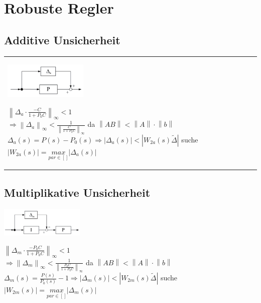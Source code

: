 \section{Robuste Regler}

\subsection{Additive Unsicherheit}

\begin{tabular}{ll}
	\parbox{5cm}{
	\includegraphics[width=4cm]{./bilder/rob_add.png}}
	\parbox{15cm}{
		$ \left \lVert \Delta_a \cdot \frac{-C}{1+P_0 C} \right\rVert_\infty < 1 $\\
		$ \Rightarrow \left \lVert \Delta_a \right\rVert_\infty < \frac{1}{\left \lVert \frac{C}{1+P_0 C} \right\rVert_\infty}$ da $\left \lVert AB \right\rVert < \left \lVert A \right\rVert \cdot \left \lVert b \right\rVert$\\
		$\Delta_a(s)=P(s) - P_0(s) \Rightarrow \left| \Delta_a(s) \right| < \left| W_{2a}(s)\tilde{\Delta} \right| $ suche $\left| W_{2a}(s) \right|  = \underset{par\in[]}{max} \left| \Delta_a(s) \right| $
		}
\end{tabular}		

\subsection{Multiplikative Unsicherheit}
	\parbox{5cm}{
	\includegraphics[width=4cm]{./bilder/rob_mult.png}}
	\parbox{15cm}{
		$ \left \lVert \Delta_m \cdot \frac{-P_0C}{1+P_0 C} \right\rVert_\infty < 1 $\\
		$ \Rightarrow \left \lVert \Delta_m \right\rVert_\infty < \frac{1}{\left \lVert \frac{P_0C}{1+P_0 C} \right\rVert_\infty}$ da $\left \lVert AB \right\rVert < \left \lVert A \right\rVert \cdot \left \lVert b \right\rVert$\\
		$\Delta_m(s)=\frac{P(s)}{P_0(s)} - 1 \Rightarrow \left| \Delta_m(s) \right| < \left| W_{2m}(s)\tilde{\Delta} \right| $ suche $\left| W_{2m}(s) \right|  = \underset{par\in[]}{max} \left| \Delta_m(s) \right| $
		}
		
